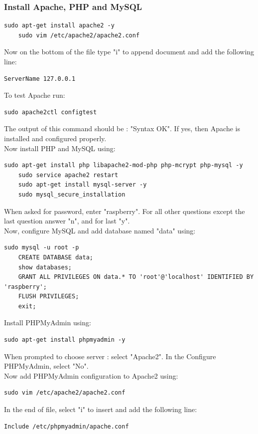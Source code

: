 \documentclass{article}
\begin{document}
\subsubsection{Install Apache, PHP and MySQL}
\begin{lstlisting}[style=BashInputStyle]
    sudo apt-get install apache2 -y
    sudo vim /etc/apache2/apache2.conf
\end{lstlisting}
Now on the bottom of the file type "i" to append document and add the following line:
\begin{lstlisting}[style=BashInputStyle]
    ServerName 127.0.0.1
\end{lstlisting}
To test Apache run:
\begin{lstlisting}[style=BashInputStyle]
    sudo apache2ctl configtest
\end{lstlisting}
The output of this command should be : "Syntax OK". If yes, then Apache is installed and configured properly. \\Now install PHP and MySQL using:
\begin{lstlisting}[style=BashInputStyle]
    sudo apt-get install php libapache2-mod-php php-mcrypt php-mysql -y
    sudo service apache2 restart
    sudo apt-get install mysql-server -y
    sudo mysql_secure_installation
\end{lstlisting}
When asked for password, enter "raspberry". For all other questions except the last question answer "n", and for last "y".\\
Now, configure MySQL and add database named "data" using:
\begin{lstlisting}[style=BashInputStyle]
    sudo mysql -u root -p
    CREATE DATABASE data;
    show databases;
    GRANT ALL PRIVILEGES ON data.* TO 'root'@'localhost' IDENTIFIED BY 'raspberry';
    FLUSH PRIVILEGES;
    exit;
\end{lstlisting}
Install PHPMyAdmin using:
\begin{lstlisting}[style=BashInputStyle]
    sudo apt-get install phpmyadmin -y
\end{lstlisting}
When prompted to choose server : select "Apache2". In the Configure PHPMyAdmin, select "No".\\ Now add PHPMyAdmin configuration to Apache2 using:
\begin{lstlisting}[style=BashInputStyle]
    sudo vim /etc/apache2/apache2.conf
\end{lstlisting}
In the end of file, select "i" to insert and add the following line:
\begin{lstlisting}[style=BashInputStyle]
    Include /etc/phpmyadmin/apache.conf
\end{lstlisting}
\end{document}
